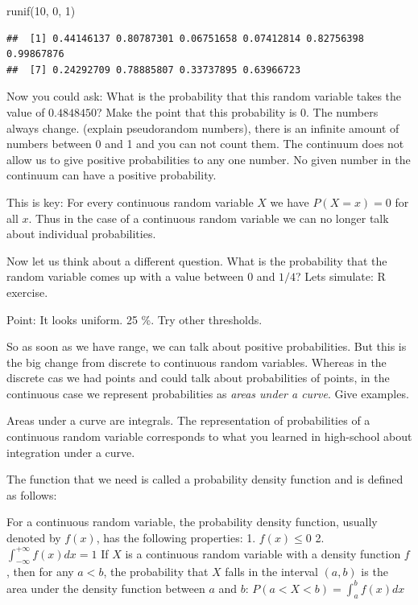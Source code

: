 \documentclass[
]{book}
\newenvironment{Shaded}{\begin{snugshade}}{\end{snugshade}}
\newcommand{\DecValTok}[1]{\textcolor[rgb]{0.00,0.00,0.81}{#1}}
\newcommand{\FunctionTok}[1]{\textcolor[rgb]{0.00,0.00,0.00}{#1}}
\newcommand{\NormalTok}[1]{#1}
\providecommand{\tightlist}{%
  \setlength{\itemsep}{0pt}\setlength{\parskip}{0pt}}
\begin{document}
\begin{Shaded}
\begin{Highlighting}[]
\FunctionTok{runif}\NormalTok{(}\DecValTok{10}\NormalTok{, }\DecValTok{0}\NormalTok{, }\DecValTok{1}\NormalTok{)}
\end{Highlighting}
\end{Shaded}

\begin{verbatim}
##  [1] 0.44146137 0.80787301 0.06751658 0.07412814 0.82756398 0.99867876
##  [7] 0.24292709 0.78885807 0.33737895 0.63966723
\end{verbatim}

Now you could ask: What is the probability that this random variable takes the value of
\(0.4848450\)? Make the point that this probability is 0. The numbers always change. (explain
pseudorandom numbers), there is an infinite amount of numbers between 0 and 1 and you can not
count them. The continuum does not allow us to give positive probabilities to any one number.
No given number in the continuum can have a positive probability.

This is key: For every continuous random variable \(X\) we have \(P(X = x) = 0\) for all \(x\). Thus
in the case of a continuous random variable we can no longer talk about individual probabilities.

Now let us think about a different question. What is the probability that the random variable comes
up with a value between \(0\) and \(1/4\)? Lets simulate: R exercise.

Point: It looks uniform. 25 \%. Try other thresholds.

So as soon as we have range, we can talk about positive probabilities. But this is the big
change from discrete to continuous random variables. Whereas in the discrete cas we had points
and could talk about probabilities of points, in the continuous case we represent
probabilities as \emph{areas under a curve}. Give examples.

Areas under a curve are integrals. The representation of probabilities of a continuous random
variable corresponds to what you learned in high-school about integration under a curve.

The function that we need is called a probability density function and is defined as follows:

\begin{description}
\tightlist
\item[Probability density function]
For a continuous random variable, the probability density function, usually denoted by
\(f(x)\), has the following properties:
1. \(f(x) \leq 0\)
2. \(\int_{-\infty}^{+\infty} f(x) dx = 1\)
If \(X\) is a continuous random variable with a density function \(f\), then for any \(a < b\), the
probability that \(X\) falls in the interval \((a,b)\) is the area under the density function between
\(a\) and \(b\):
\(P(a < X < b) = \int_a^b f(x) dx\)
\end{description}
\end{document}
